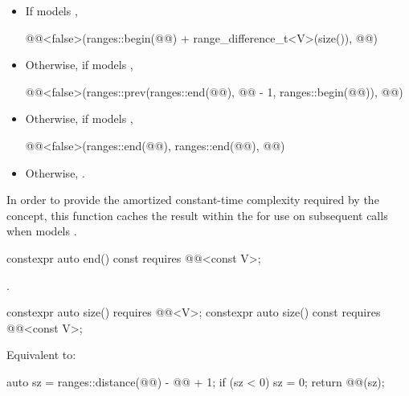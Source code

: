 \begin{itemdescr}
\pnum
\returns
\begin{itemize}
\item
If  models ,
\begin{codeblock}
@@<false>(ranges::begin(@@) + range_difference_t<V>(size()), @@)
\end{codeblock}
\item
Otherwise, if  models ,
\begin{codeblock}
@@<false>(ranges::prev(ranges::end(@@), @@ - 1, ranges::begin(@@)), @@)
\end{codeblock}
\item
Otherwise, if  models ,
\begin{codeblock}
@@<false>(ranges::end(@@), ranges::end(@@), @@)
\end{codeblock}
\item
Otherwise, .
\end{itemize}

\pnum
\remarks
In order to provide the amortized constant-time complexity
required by the  concept,
this function caches the result within the 
for use on subsequent calls
when  models .
\end{itemdescr}

\begin{itemdecl}
constexpr auto end() const requires @@<const V>;
\end{itemdecl}

\begin{itemdescr}
\pnum
\returns
{}.
\end{itemdescr}

\begin{itemdecl}
constexpr auto size() requires @@<V>;
constexpr auto size() const requires @@<const V>;
\end{itemdecl}

\begin{itemdescr}
\pnum
\effects
Equivalent to:
\begin{codeblock}
auto sz = ranges::distance(@@) - @@ + 1;
if (sz < 0) sz = 0;
return @@(sz);
\end{codeblock}
\end{itemdescr}

